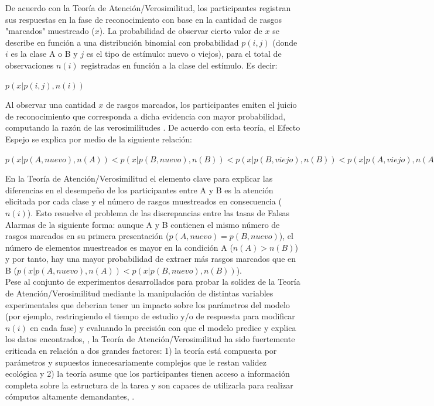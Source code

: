 De acuerdo con la Teoría de Atención/Verosimilitud, los participantes registran sus respuestas en la fase de reconocimiento con base en la cantidad de rasgos "marcados" muestreado ($x$). La probabilidad de observar cierto valor de $x$ se describe en función a una distribución binomial con probabilidad $p(i,j)$ (donde $i$ es la clase A o B y $j$ es el tipo de estímulo: nuevo o viejos), para el total de observaciones $n(i)$ registradas en función a la clase del estímulo. Es decir:\\

\begin{center}
$p(x|p(i,j),n(i))$\\
\end{center}

Al observar una cantidad $x$ de rasgos marcados, los participantes emiten el juicio de reconocimiento que corresponda a dicha evidencia con mayor probabilidad, computando la razón de las verosimilitudes \parencite{Glanzer1993, Hintzman1994, Glanzer2009, Hilford2015}. De acuerdo con esta teoría, el Efecto Espejo se explica por medio de la siguiente relación:\\

\begin{center}
$p(x|p(A,nuevo),n(A)) < p(x|p(B,nuevo),n(B)) < p(x|p(B,viejo),n(B)) < p(x|p(A,viejo),n(A))$\\
\end{center}

En la Teoría de Atención/Verosimilitud el elemento clave para explicar las diferencias en el desempeño de los participantes entre A y B es la atención elicitada por cada clase y el número de rasgos muestreados en consecuencia ($n(i)$). Esto resuelve el problema de las discrepancias entre las tasas de Falsas Alarmas de la siguiente forma: aunque A y B contienen el mismo número de rasgos marcados en su primera presentación ($p(A,nuevo) = p(B,nuevo)$), el número de elementos muestreados es mayor en la condición A ($n(A) > n(B)$) y por tanto, hay una mayor probabilidad de extraer más rasgos marcados que en B ($p(x|p(A,nuevo),n(A)) < p(x|p(B,nuevo),n(B))$).\\

Pese al conjunto de experimentos desarrollados para probar la solidez de la Teoría de Atención/Verosimilitud mediante la manipulación de distintas variables experimentales que deberian tener un impacto sobre los parámetros del modelo (por ejemplo, restringiendo el tiempo de estudio y/o de respuesta para modificar $n(i)$ en cada fase) y evaluando la precisión con que el modelo predice y explica los datos encontrados, \parencite{Glanzer1993, Kim1993, Glanzer1991}, la Teoría de Atención/Verosimilitud ha sido fuertemente criticada en relación a dos grandes factores: 1) la teoría está compuesta por parámetros y supuestos innecesariamente complejos que le restan validez ecológica y 2) la teoría asume que los participantes tienen acceso a información completa sobre la estructura de la tarea y son capaces de utilizarla para realizar cómputos altamente demandantes, \parencite{Hintzman1994, Murdock1998, DeCarlo2007}.\\

